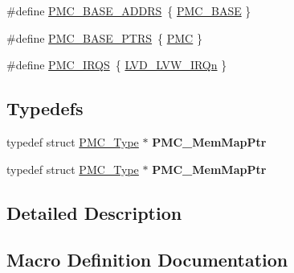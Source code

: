 \begin{DoxyCompactItemize}
\item 
\#define \hyperlink{group__PMC__Peripheral__Access__Layer_gab8cb010a2427fcd279c99d0bd4eb809f}{P\+M\+C\+\_\+\+B\+A\+S\+E\+\_\+\+A\+D\+D\+RS}~\{ \hyperlink{group__PMC__Peripheral__Access__Layer_ga4e92bd47dc68cc81e62c344586a4cdfa}{P\+M\+C\+\_\+\+B\+A\+SE} \}
\item 
\#define \hyperlink{group__PMC__Peripheral__Access__Layer_ga4bcd62643d597f7230f9c1e3d03caaa7}{P\+M\+C\+\_\+\+B\+A\+S\+E\+\_\+\+P\+T\+RS}~\{ \hyperlink{group__PMC__Peripheral__Access__Layer_ga979c6d379c67bc2f3e8eb6efcb509f69}{P\+MC} \}
\item 
\#define \hyperlink{group__PMC__Peripheral__Access__Layer_ga55eb026c8e8941e1e4d009d8563784b0}{P\+M\+C\+\_\+\+I\+R\+QS}~\{ \hyperlink{group__Interrupt__vector__numbers_gga666eb0caeb12ec0e281415592ae89083aa4897ad7f6f60bb37f339af7cc9c4477}{L\+V\+D\+\_\+\+L\+V\+W\+\_\+\+I\+R\+Qn} \}
\end{DoxyCompactItemize}
\subsection*{Typedefs}
\begin{DoxyCompactItemize}
\item 
typedef struct \hyperlink{structPMC__Type}{P\+M\+C\+\_\+\+Type} $\ast$ {\bfseries P\+M\+C\+\_\+\+Mem\+Map\+Ptr}\hypertarget{group__PMC__Peripheral__Access__Layer_gae98c417d506aa6b64d7d08b225a7a27c}{}\label{group__PMC__Peripheral__Access__Layer_gae98c417d506aa6b64d7d08b225a7a27c}

\item 
typedef struct \hyperlink{structPMC__Type}{P\+M\+C\+\_\+\+Type} $\ast$ {\bfseries P\+M\+C\+\_\+\+Mem\+Map\+Ptr}\hypertarget{group__PMC__Peripheral__Access__Layer_gae98c417d506aa6b64d7d08b225a7a27c}{}\label{group__PMC__Peripheral__Access__Layer_gae98c417d506aa6b64d7d08b225a7a27c}

\end{DoxyCompactItemize}


\subsection{Detailed Description}


\subsection{Macro Definition Documentation}
